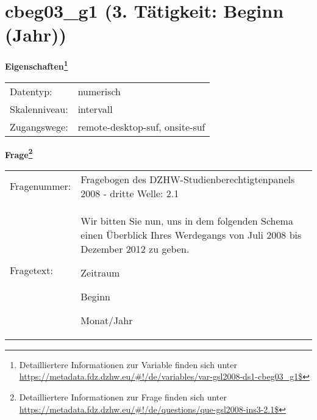 
    \setcounter{footnote}{0}

    \vspace*{-1.8cm}
	\section{cbeg03\_g1 (3. Tätigkeit: Beginn (Jahr))}
	\label{section:cbeg03_g1}



    \vspace*{0.5cm}
    \noindent\textbf{Eigenschaften\footnote{Detailliertere Informationen zur Variable finden sich unter
		\url{https://metadata.fdz.dzhw.eu/\#!/de/variables/var-gsl2008-ds1-cbeg03_g1$}}}\\
	\begin{tabularx}{\hsize}{@{}lX}
	Datentyp: & numerisch \\
	Skalenniveau: & intervall \\
	Zugangswege: &
	  remote-desktop-suf, 
	  onsite-suf
 \\
    \end{tabularx}



				\vspace*{0.5cm}
                \noindent\textbf{Frage\footnote{Detailliertere Informationen zur Frage finden sich unter
		              \url{https://metadata.fdz.dzhw.eu/\#!/de/questions/que-gsl2008-ins3-2.1$}}}\\
				\begin{tabularx}{\hsize}{@{}lX}
					Fragenummer: &
					  Fragebogen des DZHW-Studienberechtigtenpanels 2008 - dritte Welle:
					  2.1
 \\
					Fragetext: & Wir bitten Sie nun, uns in dem folgenden Schema einen Überblick Ihres Werdegangs von Juli 2008 bis Dezember 2012 zu geben.\par  Zeitraum\par  Beginn\par  Monat/Jahr \\
				\end{tabularx}





